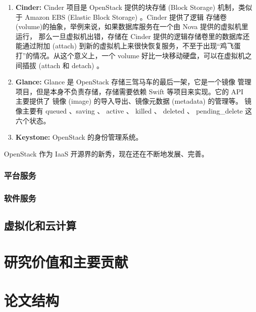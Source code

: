 \begin{enumerate}
     (SAN) 或者网络附属存储 (NAS) 来保证数据的集中管理。在虚拟化的世界中，虚拟机数据的
    集中存储更是至关重要，因为虚拟机的临时存储好比无源之水、无本之木，随着虚拟机的删除，
    它存储的数据也就消失了。对象存储和快存储就是为了解决这个问题，好把数据统一管理起来。
    OpenStack 里的对象存储就是 Swift ，Swift 又分为访问层和存储层两部分，分别负责
    RESTful 请求的处理、权限控制和实际对象数据的存储。Swift 主要应用在不容易发生变化的
    数据文件上，例如磁盘镜像文件和备份文件，当然还有大的媒体文件。
    \item \textbf{Cinder:} Cinder 项目是 OpenStack 提供的块存储 (Block Storage)
     机制，类似于 Amazon EBS (Elastic Block Storage) 。Cinder 提供了逻辑
    存储卷 (volume)的抽象，举例来说，如果数据库服务在一个由 Nova 提供的虚拟机里运行，
    那么一旦虚拟机出错，存储在 Cinder 提供的逻辑存储卷里的数据库还能通过附加 (attach)
     到新的虚拟机上来很快恢复服务，不至于出现“鸡飞蛋打”的情况。从这个意义上，一个 volume
     好比一块移动硬盘，可以在虚拟机之间插拔 (attach 和 detach) 。~\cite{cinder}
    \item \textbf{Glance:} Glance 是 OpenStack 存储三驾马车的最后一架，它是一个镜像
    管理项目，但是本身不负责存储，存储需要依赖 Swift 等项目来实现。它的 API 主要提供了
    镜像 (image) 的导入导出、镜像元数据 (metadata) 的管理等。
    镜像主要有 queued 、saving 、 active 、 killed 、
     deleted 、 pending\_delete 这六个状态。
    \item \textbf{Keystone:} OpenStack 的身份管理系统。
\end{enumerate}

OpenStack 作为 IaaS 开源界的新秀，现在还在不断地发展、完善。

\subsubsection{平台服务}

\subsubsection{软件服务}

\subsection{虚拟化和云计算}

\section{研究价值和主要贡献}

\section{论文结构}
